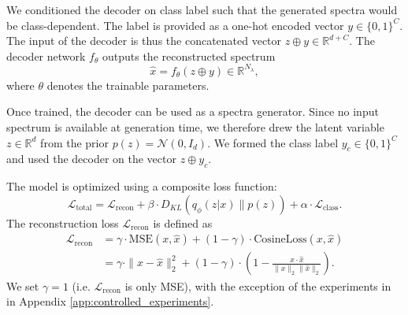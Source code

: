 \documentclass[12pt]{article}
\theoremstyle{paper}
\newif\ifdraft\drafttrue
\newcommand{\TODO}[1]{\ifdraft{\color{red}[TODO: #1]}\fi}
\begin{document}
We conditioned the decoder on class label such that the generated spectra would be class-dependent. The label is provided as a one-hot encoded vector $y \in \{0,1\}^C$. The input of the decoder is thus the concatenated vector $z \oplus y \in \mathbb{R}^{d + C}$. The decoder network $f_\theta$ outputs the reconstructed spectrum 
\begin{equation}
\hat{x} = f_\theta(z \oplus y) \in \mathbb{R}^{N_\lambda},
\end{equation} where $\theta$ denotes the trainable parameters.

Once trained, the decoder can be used as a spectra generator. Since no input spectrum is available at generation time, we therefore drew the latent variable $z \in \mathbb{R}^d$ from the prior $p(z) = \mathcal{N}(0, I_d)$. We formed the class label $y_c \in \{0,1\}^C$ and used the decoder on the vector $z \oplus y_c$. 


The model is optimized using a composite loss function:
\begin{equation}
\mathcal{L}_{\text{total}} = \mathcal{L}_{\text{recon}} + \beta \cdot D_{KL}\left(q_\phi(z|x) \| p(z)\right) + \alpha \cdot \mathcal{L}_{\text{class}}. 
\end{equation} The reconstruction loss $\mathcal{L}_{\text{recon}}$ is defined as
\begin{align}
\mathcal{L}_{\text{recon}} &= \gamma \cdot \text{MSE}(x, \hat{x}) + (1 - \gamma) \cdot \text{CosineLoss}(x, \hat{x}) \\
\nonumber &= \gamma \cdot \| x - \hat{x} \|_2^2 + (1 - \gamma) \cdot \left(1 - \frac{x \cdot \hat{x}}{\|x\|_2 \|\hat{x}\|_2}\right). 
\end{align} We set $\gamma = 1$ (i.e. $\mathcal{L}_{\text{recon}}$ is only MSE), with the exception of the experiments in  in Appendix \ref{app:controlled_experiments}.

\end{document}
